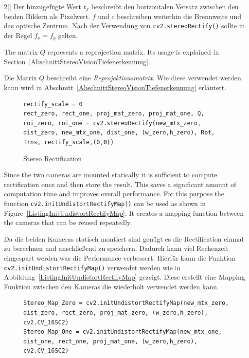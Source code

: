 \begin{paracol}{2}[]
Der hinzugefügte Wert $t_x$ beschreibt den horizontalen Versatz zwischen den beiden Bildern als Pixelwert. $f$ und $c$ beschreiben weiterhin die Brennweite und das optische Zentrum. Nach der Verwendung von \texttt{cv2.stereoRectify()} sollte in der Regel $f_x = f_y$ gelten.

\coleng

The matrix $Q$ represents a reprojection matrix. Its usage is explained in Section~\ref{AbschnittStereoVisionTiefenerkennung}.

\colger

Die Matrix $Q$ beschreibt eine \textsl{Reprojektionsmatrix}. Wie diese verwendet werden kann wird in Abschnitt~\ref{AbschnittStereoVisionTiefenerkennung} erläutert.

\colende

\begin{figure}
	\begin{lstlisting}[style=shell]
rectify_scale = 0
rect_zero, rect_one, proj_mat_zero, proj_mat_one, Q, roi_zero, roi_one = cv2.stereoRectify(new_mtx_zero, dist_zero, new_mtx_one, dist_one, (w_zero,h_zero), Rot, Trns, rectify_scale,(0,0))
	\end{lstlisting}
	\caption{Stereo Rectification}
	\label{ListingStereoRectification}
\end{figure}

\colstart

Since the two cameras are mounted statically it is sufficient to compute rectification once and then store the result. This saves a significant amount of computation time and improves overall performance. For this purpose the function \texttt{cv2.initUndistortRectifyMap()} can be used as shown in Figure~\ref{ListingInitUndistortRectifyMap}. It creates a mapping function between the cameras that can be reused repeatedly.

\colger

Da die beiden Kameras statisch montiert sind genügt es die Rectification einmal zu berechnen und anschließend zu speichern. Dadurch kann viel Rechenzeit eingespart werden was die Performance verbessert. Hierfür kann die Funktion \texttt{cv2.initUndistortRectifyMap()} verwendet werden wie in Abbildung~\ref{ListingInitUndistortRectifyMap} gezeigt. Diese erstellt eine Mapping Funktion zwischen den Kameras die wiederholt verwendet werden kann.

\colende

\begin{figure}
	\begin{lstlisting}[style=shell]
Stereo_Map_Zero = cv2.initUndistortRectifyMap(new_mtx_zero, dist_zero, rect_zero, proj_mat_zero, (w_zero,h_zero), cv2.CV_16SC2)
Stereo_Map_One = cv2.initUndistortRectifyMap(new_mtx_one, dist_one, rect_one, proj_mat_one, (w_zero,h_zero), cv2.CV_16SC2)


\end{lstlisting}
\end{figure}
\end{paracol}
